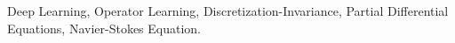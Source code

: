 \documentclass[twoside,11pt]{article}
\begin{document}
\maketitle


\begin{abstract}


 
\end{abstract}

\begin{keywords}
  Deep Learning, Operator Learning, Discretization-Invariance, Partial Differential Equations, Navier-Stokes Equation.
\end{keywords}

%
%





%
%





%
%





%
%










\end{document}

